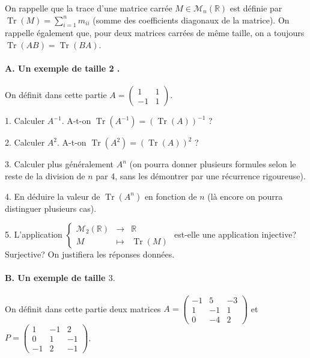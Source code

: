 \documentclass[a4paper, 11pt,reqno]{article}
\begin{document}
\begin{exercice}

On rappelle que la trace d'une matrice carrée $M \in \mathcal{M}_{n}(\mathbb{R})$ est définie par $\operatorname{Tr}(M)=\sum_{i=1}^{n} m_{i i}$ (somme des coefficients diagonaux de la matrice). On rappelle également que, pour deux matrices carrées de même taille, on a toujours $\operatorname{Tr}(A B)=\operatorname{Tr}(B A)$.

\paragraph{A. Un exemple de taille 2 .}

On définit dans cette partie $A=\left(\begin{array}{cc}1 & 1 \\ -1 & 1\end{array}\right)$.

1. Calculer $A^{-1}$. A-t-on $\operatorname{Tr}\left(A^{-1}\right)=(\operatorname{Tr}(A))^{-1}$ ?

2. Calculer $A^{2}$. A-t-on $\operatorname{Tr}\left(A^{2}\right)=(\operatorname{Tr}(A))^{2}$ ?

3. Calculer plus généralement $A^{n}$ (on pourra donner plusieurs formules selon le reste de la division de $n$ par 4, sans les démontrer par une récurrence rigoureuse).

4. En déduire la valeur de $\operatorname{Tr}\left(A^{n}\right)$ en fonction de $n$ (là encore on pourra distinguer plusieurs cas).

5. L'application $\left\{\begin{array}{ccc}\mathcal{M}_{2}(\mathbb{R}) & \rightarrow & \mathbb{R} \\ M & \mapsto & \operatorname{Tr}(M)\end{array}\right.$ est-elle une application injective? Surjective? On justifiera les réponses données.

\paragraph{B. Un exemple de taille $3 .$}

On définit dans cette partie deux matrices $A=\left(\begin{array}{ccc}-1 & 5 & -3 \\ 1 & -1 & 1 \\ 0 & -4 & 2\end{array}\right)$ et $P=\left(\begin{array}{ccc}1 & -1 & 2 \\ 0 & 1 & -1 \\ -1 & 2 & -1\end{array}\right)$.


\end{exercice}
\end{document}

